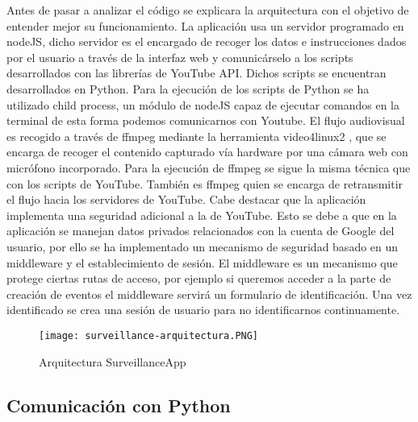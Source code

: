 Antes de pasar a analizar el código se explicara la arquitectura con el objetivo de entender mejor su funcionamiento.
La aplicación usa un servidor programado en nodeJS, dicho servidor es el encargado de recoger los datos e instrucciones dados por el usuario a través de la interfaz web y comunicárselo a los scripts desarrollados con las librerías de YouTube API. Dichos scripts se encuentran desarrollados en Python.
Para la ejecución de los scripts de Python se ha utilizado child process, un módulo de nodeJS capaz de ejecutar comandos en la terminal de esta forma podemos comunicarnos con Youtube.
El flujo audiovisual es recogido a través de ffmpeg mediante la herramienta video4linux2 , que se encarga de recoger el contenido capturado vía hardware por una cámara web con micrófono incorporado. Para la ejecución de ffmpeg se sigue la misma técnica que con los scripts de YouTube. También es ffmpeg quien se encarga de retransmitir el flujo hacia los servidores de YouTube.
Cabe destacar que la aplicación implementa una seguridad adicional a la de YouTube. Esto se debe a que en la aplicación se manejan datos privados relacionados con la cuenta de Google del usuario, por ello se ha implementado un mecanismo de seguridad basado en un middleware y el establecimiento de sesión. El middleware es un mecanismo que protege ciertas rutas de acceso, por ejemplo si queremos acceder a la parte de creación de eventos el middleware servirá un formulario de identificación. Una vez identificado se crea una sesión de usuario para no identificarnos continuamente.

\begin{figure}[H]
    \centering
    \texttt{[image: surveillance-arquitectura.PNG]}
    \caption{Arquitectura SurveillanceApp}
\end{figure}

\subsection{Comunicación con Python}

